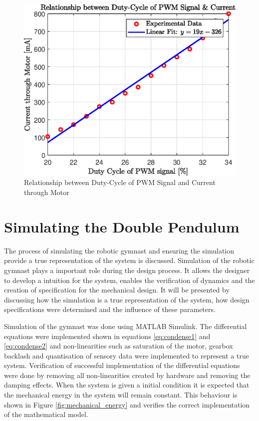 \documentclass[a4paper,12pt]{article}
\begin{document}
	\begin{figure}[h]
	\centering
	\includegraphics[scale=1]{dutycycle_vs_current.eps}
	\caption{Relationship between Duty-Cycle of PWM Signal and Current through Motor}
	\label{fig:dutycycle_vs_current}
\end{figure}


	

	
	\section{Simulating the Double Pendulum}
	
	The process of simulating the robotic gymnast and ensuring the simulation provide a true representation of the system is discussed. Simulation of the robotic gymnast plays a important role during the design process. It allows the designer to develop a intuition for the system, enables the verification of dynamics and the creation of specification for the mechanical design. It will be presented by discussing how the simulation is a true representation of the system, how design specifications were determined and the influence of these parameters.

	Simulation of the gymnast was done using MATLAB Simulink. The differential equations were implemented shown in equations \ref{eq:condense1} and \ref{eq:condense2} and non-linearities such as saturation of the motor, gearbox backlash and quantisation of sensory data were implemented to represent a true system. Verification of successful implementation of the differential equations were done by removing all non-linearities created by hardware and removing the damping effects. When the system is given a initial condition it is expected that the mechanical energy in the system will remain constant. This behaviour is shown in Figure \ref{fig:mechanical_energy} and verifies the correct implementation of the mathematical model. 
	
\end{document}
